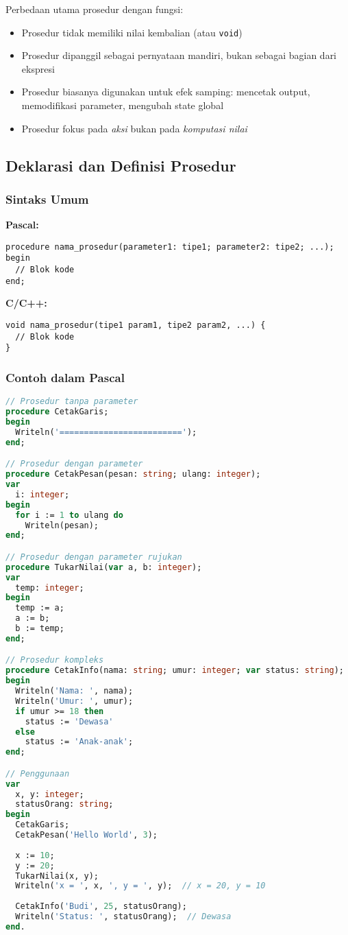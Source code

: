 \documentclass[../main.tex]{subfiles}
\begin{document}
Perbedaan utama prosedur dengan fungsi:
\begin{itemize}
  \item Prosedur tidak memiliki nilai kembalian (atau \texttt{void})
  \item Prosedur dipanggil sebagai pernyataan mandiri, bukan sebagai bagian dari ekspresi
  \item Prosedur biasanya digunakan untuk efek samping: mencetak output, memodifikasi parameter, mengubah state global
  \item Prosedur fokus pada \emph{aksi} bukan pada \emph{komputasi nilai}
\end{itemize}

\subsection{Deklarasi dan Definisi Prosedur}
\subsubsection{Sintaks Umum}
\textbf{Pascal:}
\begin{verbatim}
procedure nama_prosedur(parameter1: tipe1; parameter2: tipe2; ...);
begin
  // Blok kode
end;
\end{verbatim}

\textbf{C/C++:}
\begin{verbatim}
void nama_prosedur(tipe1 param1, tipe2 param2, ...) {
  // Blok kode
}
\end{verbatim}

\subsubsection{Contoh dalam Pascal}
\begin{lstlisting}[language=Pascal, caption={Deklarasi dan definisi prosedur (Pascal)}]
// Prosedur tanpa parameter
procedure CetakGaris;
begin
  Writeln('=========================');
end;

// Prosedur dengan parameter
procedure CetakPesan(pesan: string; ulang: integer);
var
  i: integer;
begin
  for i := 1 to ulang do
    Writeln(pesan);
end;

// Prosedur dengan parameter rujukan
procedure TukarNilai(var a, b: integer);
var
  temp: integer;
begin
  temp := a;
  a := b;
  b := temp;
end;

// Prosedur kompleks
procedure CetakInfo(nama: string; umur: integer; var status: string);
begin
  Writeln('Nama: ', nama);
  Writeln('Umur: ', umur);
  if umur >= 18 then
    status := 'Dewasa'
  else
    status := 'Anak-anak';
end;

// Penggunaan
var
  x, y: integer;
  statusOrang: string;
begin
  CetakGaris;
  CetakPesan('Hello World', 3);
  
  x := 10;
  y := 20;
  TukarNilai(x, y);
  Writeln('x = ', x, ', y = ', y);  // x = 20, y = 10
  
  CetakInfo('Budi', 25, statusOrang);
  Writeln('Status: ', statusOrang);  // Dewasa
end.
\end{lstlisting}
\end{document}
